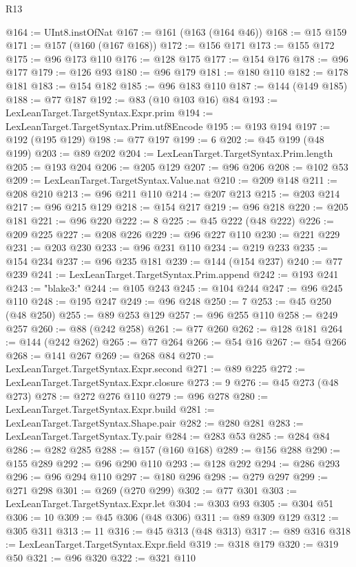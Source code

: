 \begin{lexlean}{R13}
\begin{coremodule}
{{{{{{{{{{{{{{{{{{{{{{{{{{{{{{{{{{{{{{{{{{{{{{{{{{{{{{{{{{{{{{{{{{{{{{{{{{{{{{{{{{{{{{{{{{{{{{{{{{{{{{{{{{@164 := UInt8.instOfNat
@167 := @161 (@163 (@164 @46))
@168 := @15 @159
@171 := @157 (@160 (@167 @168))
@172 := @156 @171
@173 := @155 @172
@175 := @96 @173 @110
@176 := @128 @175
@177 := @154 @176
@178 := @96 @177
@179 := @126 @93
@180 := @96 @179
@181 := @180 @110
@182 := @178 @181
@183 := @154 @182
@185 := @96 @183 @110
@187 := @144 (@149 @185)
@188 := @77 @187
@192 := @83 (@10 @103 @16) @84
@193 := LexLeanTarget.TargetSyntax.Expr.prim
@194 := LexLeanTarget.TargetSyntax.Prim.utf8Encode
@195 := @193 @194
@197 := @192 (@195 @129)
@198 := @77 @197
@199 := 6
@202 := @45 @199 (@48 @199)
@203 := @89 @202
@204 := LexLeanTarget.TargetSyntax.Prim.length
@205 := @193 @204
@206 := @205 @129
@207 := @96 @206
@208 := @102 @53
@209 := LexLeanTarget.TargetSyntax.Value.nat
@210 := @209 @148
@211 := @208 @210
@213 := @96 @211 @110
@214 := @207 @213
@215 := @203 @214
@217 := @96 @215 @129
@218 := @154 @217
@219 := @96 @218
@220 := @205 @181
@221 := @96 @220
@222 := 8
@225 := @45 @222 (@48 @222)
@226 := @209 @225
@227 := @208 @226
@229 := @96 @227 @110
@230 := @221 @229
@231 := @203 @230
@233 := @96 @231 @110
@234 := @219 @233
@235 := @154 @234
@237 := @96 @235 @181
@239 := @144 (@154 @237)
@240 := @77 @239
@241 := LexLeanTarget.TargetSyntax.Prim.append
@242 := @193 @241
@243 := "blake3:"
@244 := @105 @243
@245 := @104 @244
@247 := @96 @245 @110
@248 := @195 @247
@249 := @96 @248
@250 := 7
@253 := @45 @250 (@48 @250)
@255 := @89 @253 @129
@257 := @96 @255 @110
@258 := @249 @257
@260 := @88 (@242 @258)
@261 := @77 @260
@262 := @128 @181
@264 := @144 (@242 @262)
@265 := @77 @264
@266 := @54 @16
@267 := @54 @266
@268 := @141 @267
@269 := @268 @84
@270 := LexLeanTarget.TargetSyntax.Expr.second
@271 := @89 @225
@272 := LexLeanTarget.TargetSyntax.Expr.closure
@273 := 9
@276 := @45 @273 (@48 @273)
@278 := @272 @276 @110
@279 := @96 @278
@280 := LexLeanTarget.TargetSyntax.Expr.build
@281 := LexLeanTarget.TargetSyntax.Shape.pair
@282 := @280 @281
@283 := LexLeanTarget.TargetSyntax.Ty.pair
@284 := @283 @53
@285 := @284 @84
@286 := @282 @285
@288 := @157 (@160 @168)
@289 := @156 @288
@290 := @155 @289
@292 := @96 @290 @110
@293 := @128 @292
@294 := @286 @293
@296 := @96 @294 @110
@297 := @180 @296
@298 := @279 @297
@299 := @271 @298
@301 := @269 (@270 @299)
@302 := @77 @301
@303 := LexLeanTarget.TargetSyntax.Expr.let
@304 := @303 @93
@305 := @304 @51
@306 := 10
@309 := @45 @306 (@48 @306)
@311 := @89 @309 @129
@312 := @305 @311
@313 := 11
@316 := @45 @313 (@48 @313)
@317 := @89 @316
@318 := LexLeanTarget.TargetSyntax.Expr.field
@319 := @318 @179
@320 := @319 @50
@321 := @96 @320
@322 := @321 @110
}}}}}}}}}}}}}}}}}}}}}}}}}}}}}}}}}}}}}}}}}}}}}}}}}}}}}}}}}}}}}}}}}}}}}}}}}}}}}}}}}}}}}}}}}}}}}}}}}}}}}}}}}}
\end{coremodule}
\end{lexlean}
